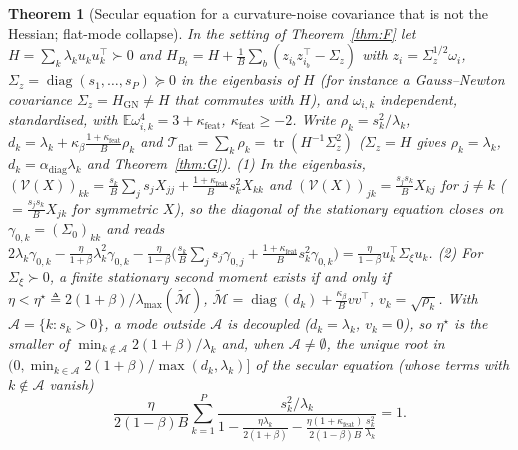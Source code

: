 \documentclass[11pt]{article}
\newtheorem{theorem}{Theorem}
\theoremstyle{remark}
\newcommand{\E}{\mathbb{E}}
\newcommand{\tr}{\operatorname{tr}}
\begin{document}
\begin{theorem}[Secular equation for a curvature-noise covariance that is not the Hessian; flat-mode collapse]\label{thm:G5}
In the setting of Theorem~\ref{thm:F} let $H=\sum_k\lambda_ku_ku_k^\top\succ0$ and $H_{B_t}=H+\frac1B\sum_{b}(z_{i_b}z_{i_b}^\top-\Sigma_z)$ with $z_i=\Sigma_z^{1/2}\omega_i$, $\Sigma_z=\operatorname{diag}(s_1,\dots,s_P)\succeq0$ in the eigenbasis of $H$ (for instance a Gauss--Newton covariance $\Sigma_z=H_{\mathrm{GN}}\neq H$ that commutes with $H$), and $\omega_{i,k}$ independent, standardised, with $\E\omega_{i,k}^4=3+\kappa_{\mathrm{feat}}$, $\kappa_{\mathrm{feat}}\ge-2$. Write $\rho_k=s_k^2/\lambda_k$, $d_k=\lambda_k+\kappa_\beta\frac{1+\kappa_{\mathrm{feat}}}{B}\rho_k$ and $\mathcal T_{\mathrm{flat}}=\sum_k\rho_k=\tr(H^{-1}\Sigma_z^2)$ ($\Sigma_z=H$ gives $\rho_k=\lambda_k$, $d_k=\alpha_{\mathrm{diag}}\lambda_k$ and Theorem~\ref{thm:G}).
(1) In the eigenbasis, $(\mathcal V(X))_{kk}=\frac{s_k}{B}\sum_js_jX_{jj}+\frac{1+\kappa_{\mathrm{feat}}}{B}s_k^2X_{kk}$ and $(\mathcal V(X))_{jk}=\frac{s_js_k}{B}X_{kj}$ for $j\ne k$ ($=\frac{s_js_k}{B}X_{jk}$ for symmetric $X$), so the diagonal of the stationary equation closes on $\gamma_{0,k}=(\Sigma_0)_{kk}$ and reads $2\lambda_k\gamma_{0,k}-\frac{\eta}{1+\beta}\lambda_k^2\gamma_{0,k}-\frac{\eta}{1-\beta}\big(\frac{s_k}{B}\sum_js_j\gamma_{0,j}+\frac{1+\kappa_{\mathrm{feat}}}{B}s_k^2\gamma_{0,k}\big)=\frac{\eta}{1-\beta}u_k^\top\Sigma_\xi u_k$.
(2) For $\Sigma_\xi\succ0$, a finite stationary second moment exists if and only if $\eta<\eta^\star\triangleq2(1+\beta)/\lambda_{\max}(\widetilde{\mathcal M})$, $\widetilde{\mathcal M}=\operatorname{diag}(d_k)+\frac{\kappa_\beta}{B}vv^\top$, $v_k=\sqrt{\rho_k}$. With $\mathcal A=\{k:s_k>0\}$, a mode outside $\mathcal A$ is decoupled ($d_k=\lambda_k$, $v_k=0$), so $\eta^\star$ is the smaller of $\min_{k\notin\mathcal A}2(1+\beta)/\lambda_k$ and, when $\mathcal A\ne\emptyset$, the unique root in $(0,\min_{k\in\mathcal A}2(1+\beta)/\max(d_k,\lambda_k)]$ of the secular equation (whose terms with $k\notin\mathcal A$ vanish)
\[
\frac{\eta}{2(1-\beta)B}\sum_{k=1}^P\frac{s_k^2/\lambda_k}{1-\frac{\eta\lambda_k}{2(1+\beta)}-\frac{\eta(1+\kappa_{\mathrm{feat}})}{2(1-\beta)B}\frac{s_k^2}{\lambda_k}}=1.
\]

\end{theorem}
\end{document}
